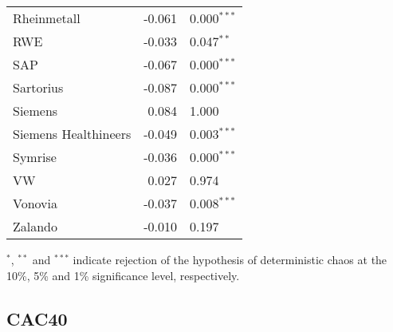 \documentclass[12pt]{article}
\begin{document}
\begin{table} [H]
\begin{tabular*}{\textwidth}{@{\extracolsep{\fill}}lrl}
        Rheinmetall               & -0.061 & 0.000$^{***}$  \\ 
        RWE                       & -0.033 &  0.047$^{**}$  \\ 
        SAP                       & -0.067 &  0.000$^{***}$ \\ 
        Sartorius                 & -0.087 & 0.000$^{***}$  \\ 
        Siemens                   &  0.084 &  1.000 \\ 
        Siemens Healthineers      & -0.049 &  0.003$^{***}$  \\ 
        Symrise                   & -0.036 &  0.000$^{***}$ \\ 
        VW                        & 0.027  &   0.974 \\ 
        Vonovia                   & -0.037 &   0.008$^{***}$  \\ 
        Zalando                   & -0.010 &   0.197 \\ 
        \hline      
    \end{tabular*}
        {$^{*}$, $^{**}$ and $^{***}$ indicate rejection of the hypothesis of  deterministic chaos at the 10\%, 5\% and 1\% significance level, respectively.}
\end{table}



\subsection{CAC40}
\end{document}
